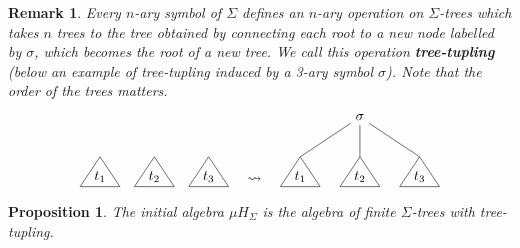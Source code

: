 \documentclass[letterpaper, 11pt, oneside]{memoir}
\theoremstyle{myteo}
\newtheorem{proposition}[theorem]{Proposition}
\newtheorem{remark}[theorem]{Remark}
\numberwithin{equation}{section}
\newcommand{\marginnote}[1]{\marginpar{\footnotesize #1}}
\begin{document}
\begin{remark}
  \label{rem:treetupling}
  Every \(n\)-ary symbol of \(\Sigma\) defines an \(n\)-ary operation on \(\Sigma\)-trees which takes \(n\) trees to the tree obtained by connecting each root to a new node labelled by \(\sigma\), which becomes the root of a new tree.
  We call this operation \textbf{tree-tupling} (below an example of tree-tupling induced by a 3-ary symbol \(\sigma\)).\marginnote{tree-tupling}
  Note that the order of the trees matters.
  \begin{equation*}
    \begin{tikzpicture}
      \node (t) at (0,0){\(t_1\)};
      \draw[-] (0,0.5) -- (.5, -.25) -- (-.5, -.25) -- (0, .5);
    \end{tikzpicture}\quad
    \begin{tikzpicture}
      \node (t) at (0,0){\(t_2\)};
      \draw[-] (0,0.5) -- (.5, -.25) -- (-.5, -.25) -- (0, .5);
    \end{tikzpicture}\quad
    \begin{tikzpicture}
      \node (t) at (0,0){\(t_3\)};
      \draw[-] (0,0.5) -- (.5, -.25) -- (-.5, -.25) -- (0, .5);
    \end{tikzpicture}\quad
    \begin{tikzpicture}
      \node (t) at (0, 3){\(\rightsquigarrow\)};
    \end{tikzpicture}\quad
    \begin{tikzpicture}
      \node (t1) at (0,0){\(t_1\)};
      \node (t2) at (1.5,0){\(t_2\)};
      \node (t3) at (3,0){\(t_3\)};
      \node (s) at (1.5, 1.5){\(\sigma\)};
      
      \draw[-] (0,0.5) -- (.5, -.25) -- (-.5, -.25) -- (0, .5);
      \draw[-] (1.5,0.5) -- (2, -.25) -- (1, -.25) -- (1.5, .5);
      \draw[-] (3,0.5) -- (3.5, -.25) -- (2.5, -.25) -- (3, .5);

      \draw[-] (s) -- (0,0.5);
      \draw[-] (s) -- (1.5,0.5);
      \draw[-] (s) -- (3,0.5);
    \end{tikzpicture}
  \end{equation*}
\end{remark}

\begin{proposition}
  \label{prop:finite_sigma_trees}
  The initial algebra \(\mu H_\Sigma\) is the algebra of finite \(\Sigma\)-trees with tree-tupling.
\end{proposition}
\end{document}
